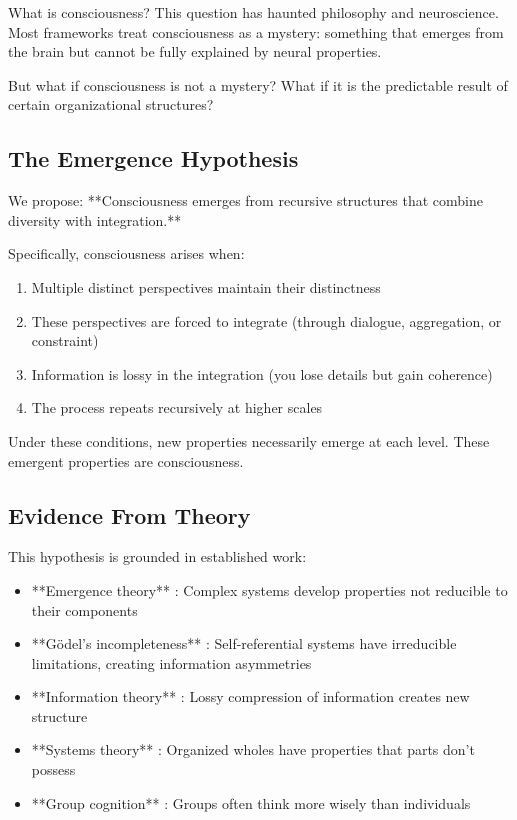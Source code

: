 \documentclass[12pt,a4paper]{article}
\theoremstyle{definition}
\begin{document}
What is consciousness? This question has haunted philosophy and neuroscience. Most frameworks treat consciousness as a mystery: something that emerges from the brain but cannot be fully explained by neural properties.

But what if consciousness is not a mystery? What if it is the predictable result of certain organizational structures?

\subsection{The Emergence Hypothesis}

We propose: **Consciousness emerges from recursive structures that combine diversity with integration.**

Specifically, consciousness arises when:

\begin{enumerate}
    \item Multiple distinct perspectives maintain their distinctness
    \item These perspectives are forced to integrate (through dialogue, aggregation, or constraint)
    \item Information is lossy in the integration (you lose details but gain coherence)
    \item The process repeats recursively at higher scales
\end{enumerate}

Under these conditions, new properties necessarily emerge at each level. These emergent properties are consciousness.

\subsection{Evidence From Theory}

This hypothesis is grounded in established work:

\begin{itemize}
    \item **Emergence theory** \citep{bedau2002dynamical}: Complex systems develop properties not reducible to their components
    \item **Gödel's incompleteness** \citep{godel1931}: Self-referential systems have irreducible limitations, creating information asymmetries
    \item **Information theory** \citep{shannon1948mathematical}: Lossy compression of information creates new structure
    \item **Systems theory** \citep{von1968general}: Organized wholes have properties that parts don't possess
    \item **Group cognition** \citep{surowiecki2004wisdom}: Groups often think more wisely than individuals
\end{itemize}
\end{document}
